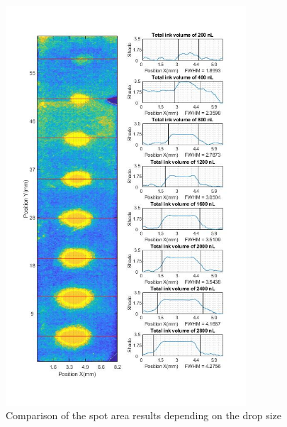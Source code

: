 \begin{figure}[H]
	\centering
	\includegraphics[width=0.8\textwidth]{grafiken/drops25.jpg}
	\caption{Comparison of the spot area results depending on the drop size}
	\label{fig:drops25}
\end{figure} 

\bigskip 

\bigskip

